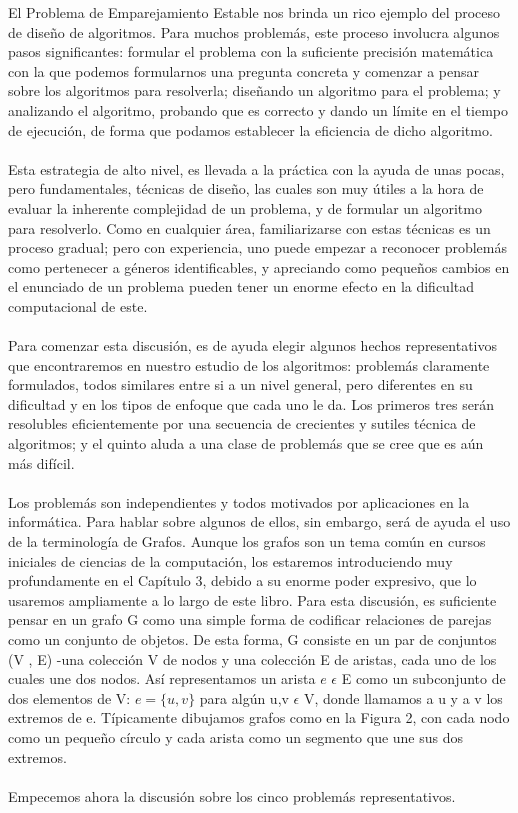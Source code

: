 \documentclass[a4paper]{article}
\begin{document}
El Problema de Emparejamiento Estable nos brinda un rico ejemplo del proceso de diseño de algoritmos. Para muchos problemás, este proceso involucra algunos pasos significantes: formular el problema con la suficiente precisión matemática con la que podemos formularnos una pregunta concreta y comenzar a pensar sobre los algoritmos para resolverla; diseñando un algoritmo para el problema; y analizando el algoritmo, probando que es correcto y dando un límite en el tiempo de ejecución, de forma que podamos establecer la eficiencia de dicho algoritmo.
\\
\\
Esta estrategia de alto nivel, es llevada a la práctica con la ayuda de unas pocas, pero fundamentales, técnicas de diseño, las cuales son muy útiles a la hora de evaluar la inherente complejidad de un problema, y de formular un algoritmo para resolverlo. Como en cualquier área, familiarizarse con estas técnicas es un proceso gradual; pero con experiencia, uno puede empezar a reconocer problemás como pertenecer a géneros identificables, y apreciando como pequeños cambios en el enunciado de un problema pueden tener un enorme efecto en la dificultad computacional de este.
\\
\\
Para comenzar esta discusión, es de ayuda elegir algunos hechos representativos que encontraremos en nuestro estudio de los algoritmos: problemás claramente formulados,  todos similares entre si a un nivel general, pero diferentes en su dificultad y en los tipos de  enfoque que cada uno le da. Los primeros tres serán resolubles eficientemente por una secuencia de crecientes y sutiles técnica de algoritmos; y el quinto aluda a una clase de problemás que se cree que es aún más difícil.
\\
\\
Los problemás son independientes y todos motivados por aplicaciones en la informática. Para hablar sobre algunos de ellos, sin embargo, será de ayuda el uso de la terminología de Grafos. Aunque los grafos son un tema común en cursos iniciales de ciencias de la computación, los estaremos introduciendo muy profundamente en el Capítulo 3, debido a su enorme poder expresivo, que lo usaremos ampliamente a lo largo de este libro. Para esta discusión, es suficiente pensar en un grafo G como una simple forma de codificar relaciones de parejas como un conjunto de objetos. De esta forma, G consiste en un par de conjuntos (V , E) -una colección V de nodos y una colección E de aristas, cada uno de los cuales une dos nodos. Así representamos un arista $e $ $ \epsilon $ E como un subconjunto de dos elementos de V: $e = \{  u,v \}$ para algún u,v $\epsilon$ V, donde llamamos a u y a v los extremos de e. Típicamente dibujamos grafos como en la Figura 2, con cada nodo como un pequeño círculo y cada arista como un segmento que une sus dos extremos.
\\
\\
Empecemos ahora la discusión sobre los cinco problemás representativos.\\
\end{document}
